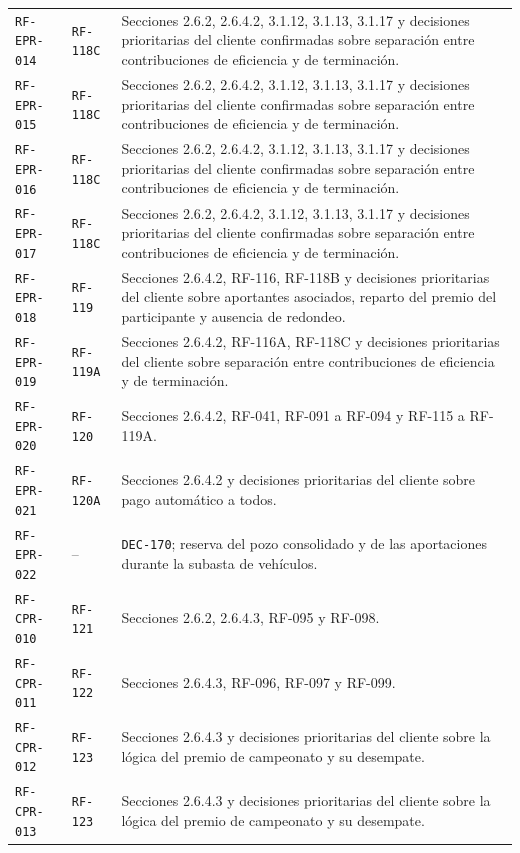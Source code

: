 \documentclass[10pt,letterpaper]{article}
\begin{document}
\begin{landscape}
\begin{longtable}{P{2.7cm}P{2.6cm}P{15.7cm}}
\texttt{RF-EPR-014} & \texttt{RF-118C} & Secciones 2.6.2, 2.6.4.2, 3.1.12, 3.1.13, 3.1.17 y decisiones prioritarias del cliente confirmadas sobre separación entre contribuciones de eficiencia y de terminación.\\
\texttt{RF-EPR-015} & \texttt{RF-118C} & Secciones 2.6.2, 2.6.4.2, 3.1.12, 3.1.13, 3.1.17 y decisiones prioritarias del cliente confirmadas sobre separación entre contribuciones de eficiencia y de terminación.\\
\texttt{RF-EPR-016} & \texttt{RF-118C} & Secciones 2.6.2, 2.6.4.2, 3.1.12, 3.1.13, 3.1.17 y decisiones prioritarias del cliente confirmadas sobre separación entre contribuciones de eficiencia y de terminación.\\
\texttt{RF-EPR-017} & \texttt{RF-118C} & Secciones 2.6.2, 2.6.4.2, 3.1.12, 3.1.13, 3.1.17 y decisiones prioritarias del cliente confirmadas sobre separación entre contribuciones de eficiencia y de terminación.\\
\texttt{RF-EPR-018} & \texttt{RF-119} & Secciones 2.6.4.2, RF-116, RF-118B y decisiones prioritarias del cliente sobre aportantes asociados, reparto del premio del participante y ausencia de redondeo.\\
\texttt{RF-EPR-019} & \texttt{RF-119A} & Secciones 2.6.4.2, RF-116A, RF-118C y decisiones prioritarias del cliente sobre separación entre contribuciones de eficiencia y de terminación.\\
\texttt{RF-EPR-020} & \texttt{RF-120} & Secciones 2.6.4.2, RF-041, RF-091 a RF-094 y RF-115 a RF-119A.\\
\texttt{RF-EPR-021} & \texttt{RF-120A} & Secciones 2.6.4.2 y decisiones prioritarias del cliente sobre pago automático a todos.\\
\texttt{RF-EPR-022} & -- & \texttt{DEC-170}; reserva del pozo consolidado y de las aportaciones durante la subasta de vehículos.\\
\texttt{RF-CPR-010} & \texttt{RF-121} & Secciones 2.6.2, 2.6.4.3, RF-095 y RF-098.\\
\texttt{RF-CPR-011} & \texttt{RF-122} & Secciones 2.6.4.3, RF-096, RF-097 y RF-099.\\
\texttt{RF-CPR-012} & \texttt{RF-123} & Secciones 2.6.4.3 y decisiones prioritarias del cliente sobre la lógica del premio de campeonato y su desempate.\\
\texttt{RF-CPR-013} & \texttt{RF-123} & Secciones 2.6.4.3 y decisiones prioritarias del cliente sobre la lógica del premio de campeonato y su desempate.\\

\end{longtable}
\end{landscape}
\end{document}
